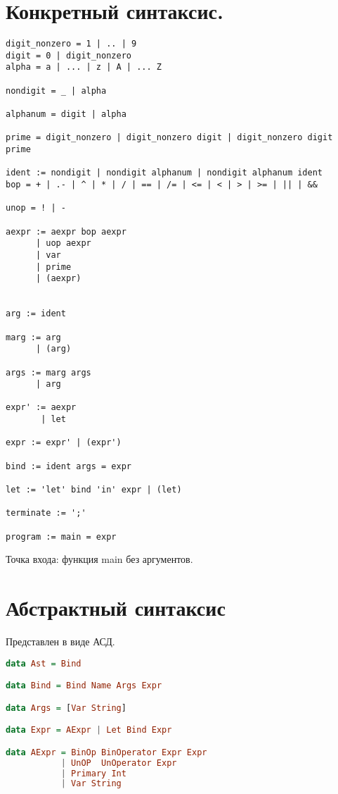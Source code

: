 \documentclass[12pt, a4paper] {ncc}
\begin{document}
\setcounter{figure}{0}

\section{Конкретный синтаксис.}
\begin{verbatim}
digit_nonzero = 1 | .. | 9
digit = 0 | digit_nonzero
alpha = a | ... | z | A | ... Z

nondigit = _ | alpha

alphanum = digit | alpha

prime = digit_nonzero | digit_nonzero digit | digit_nonzero digit prime

ident := nondigit | nondigit alphanum | nondigit alphanum ident
bop = + | .- | ^ | * | / | == | /= | <= | < | > | >= | || | && 

unop = ! | -

aexpr := aexpr bop aexpr
      | uop aexpr 
      | var 
      | prime
      | (aexpr)


arg := ident

marg := arg
      | (arg)

args := marg args
      | arg

expr' := aexpr
       | let 

expr := expr' | (expr')

bind := ident args = expr

let := 'let' bind 'in' expr | (let)

terminate := ';'

program := main = expr

\end{verbatim}

Точка входа: функция main без аргументов.

\section{Абстрактный синтаксис}

Представлен в виде АСД.

\begin{lstlisting}[language=Haskell]
data Ast = Bind

data Bind = Bind Name Args Expr

data Args = [Var String]

data Expr = AExpr | Let Bind Expr 

data AExpr = BinOp BinOperator Expr Expr
           | UnOP  UnOperator Expr
           | Primary Int
           | Var String
\end{lstlisting}
\end{document}
